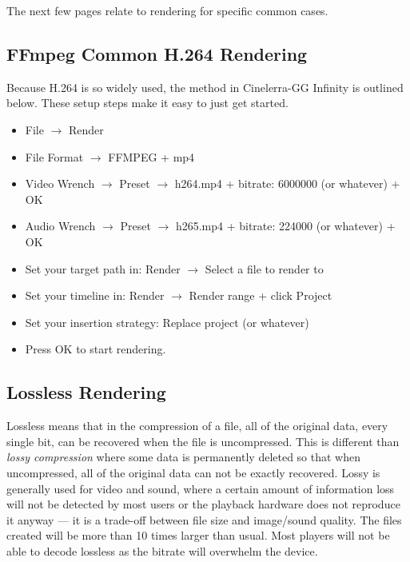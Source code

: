 \noindent The next few pages relate to rendering for specific common cases.

\subsection{FFmpeg Common H.264 Rendering}%
\label{sub:ffmpeg_h264_rendering}

Because H.264 is so widely used, the method in Cinelerra-GG Infinity is outlined below.  These setup steps make it easy to just get started.

\begin{itemize}
    \item File $\rightarrow$ Render
    \item File Format $\rightarrow$ FFMPEG + mp4
    \item Video Wrench $\rightarrow$ Preset $\rightarrow$ h264.mp4 + bitrate: 6000000 (or whatever) + OK
    \item Audio Wrench $\rightarrow$ Preset $\rightarrow$ h265.mp4 + bitrate: 224000 (or whatever) + OK
    \item Set your target path in: Render $\rightarrow$ Select a file to render to
    \item Set your timeline in: Render $\rightarrow$ Render range + click Project
    \item Set your insertion strategy: Replace project (or whatever)
    \item Press OK to start rendering.
\end{itemize}

\subsection{Lossless Rendering}%
\label{sub:loseeless_rendering}

Lossless means that in the compression of a file, all of the original data, every single bit, can be recovered when the file is uncompressed.  This is different than \textit{lossy compression} where some data is permanently deleted so that when uncompressed, all of the original data can not be exactly recovered.  Lossy is generally used for video and sound, where a certain amount of information loss will not be detected by most users or the playback hardware does not reproduce it anyway --- it is a trade-off between file size and image/sound quality.  The files created will be more than 10 times larger than usual.  Most players will not be able to decode lossless as the bitrate will overwhelm the device.

